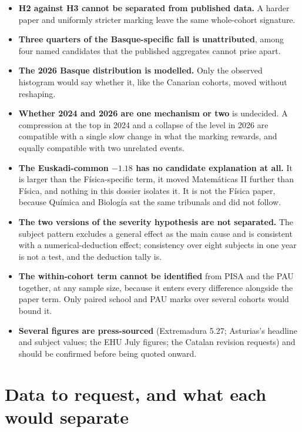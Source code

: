 \documentclass[
  10.5pt,
  a4paper,
  DIV=11,
  numbers=noendperiod]{scrartcl}
\providecommand{\tightlist}{%
  \setlength{\itemsep}{0pt}\setlength{\parskip}{0pt}}
\begin{document}
\begin{itemize}
\tightlist
\item
  \textbf{H2 against H3 cannot be separated from published data.} A
  harder paper and uniformly stricter marking leave the same
  whole-cohort signature.
\item
  \textbf{Three quarters of the Basque-specific fall is unattributed},
  among four named candidates that the published aggregates cannot prise
  apart.
\item
  \textbf{The 2026 Basque distribution is modelled.} Only the observed
  histogram would say whether it, like the Canarian cohorts, moved
  without reshaping.
\item
  \textbf{Whether 2024 and 2026 are one mechanism or two} is undecided.
  A compression at the top in 2024 and a collapse of the level in 2026
  are compatible with a single slow change in what the marking rewards,
  and equally compatible with two unrelated events.
\item
  \textbf{The Euskadi-common \(-1.18\) has no candidate explanation at
  all.} It is larger than the Física-specific term, it moved Matemáticas
  II further than Física, and nothing in this dossier isolates it. It is
  not the Física paper, because Química and Biología sat the same
  tribunals and did not follow.
\item
  \textbf{The two versions of the severity hypothesis are not
  separated.} The subject pattern excludes a general effect as the main
  cause and is consistent with a numerical-deduction effect; consistency
  over eight subjects in one year is not a test, and the deduction tally
  is.
\item
  \textbf{The within-cohort term cannot be identified} from PISA and the
  PAU together, at any sample size, because it enters every difference
  alongside the paper term. Only paired school and PAU marks over
  several cohorts would bound it.
\item
  \textbf{Several figures are press-sourced} (Extremadura 5.27;
  Asturias's headline and subject values; the EHU July figures; the
  Catalan revision requests) and should be confirmed before being quoted
  onward.
\end{itemize}

\section{Data to request, and what each would
separate}\label{data-to-request-and-what-each-would-separate}
\end{document}
